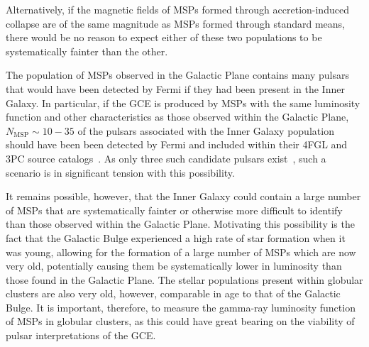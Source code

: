 %
Alternatively, if the magnetic fields of MSPs formed through accretion-induced collapse are of the same magnitude as MSPs formed through standard means, there would be no reason to expect either of these two populations to be systematically fainter than the other.



The population of MSPs observed in the Galactic Plane contains many pulsars that would have been detected by Fermi if they had been present in the Inner Galaxy. In particular, if the GCE is produced by MSPs with the same luminosity function and other characteristics as those observed within the Galactic Plane, $N_\textrm{MSP} \sim 10-35$ of the pulsars associated with the Inner Galaxy population should have been been detected by Fermi and included within their 4FGL and 3PC source catalogs~\cite{Holst:2024fvb,Fermi-LAT:2023zzt}. As only three such candidate pulsars exist~\cite{Holst:2024fvb}, such a scenario is in significant tension with this possibility.

It remains possible, however, that the Inner Galaxy could contain a large number of MSPs that are systematically fainter or otherwise more difficult to identify than those observed within the Galactic Plane. Motivating this possibility is the fact that the Galactic Bulge experienced a high rate of star formation when it was young, allowing for the formation of a large number of MSPs which are now very old, potentially causing them be systematically lower in luminosity than those found in the Galactic Plane. The stellar populations present within globular clusters are also very old, however, comparable in age to that of the Galactic Bulge. It is important, therefore, to measure the gamma-ray luminosity function of MSPs in globular clusters, as this could have great bearing on the viability of pulsar interpretations of the GCE. 

